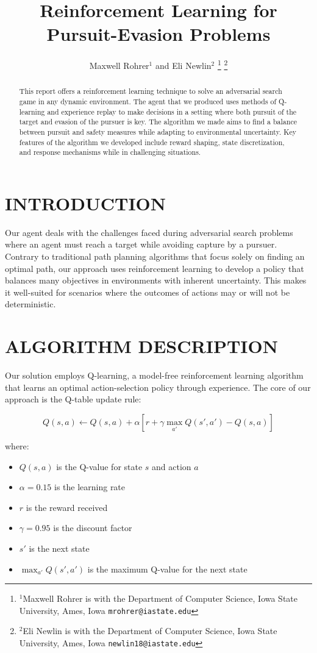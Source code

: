 \documentclass[letterpaper, 10 pt, conference]{ieeeconf}
\title{\LARGE \bf
Reinforcement Learning for Pursuit-Evasion Problems
}
\author{Maxwell Rohrer$^{1}$ and Eli Newlin$^{2}$%
\thanks{$^{1}$Maxwell Rohrer is with the Department of Computer Science, Iowa State University, Ames, Iowa
        {\tt\small mrohrer@iastate.edu}}%
\thanks{$^{2}$Eli Newlin is with the Department of Computer Science, Iowa State University, Ames, Iowa
        {\tt\small newlin18@iastate.edu}}%
}
\begin{document}
\maketitle
\thispagestyle{empty}
\pagestyle{empty}

\begin{abstract}
This report offers a reinforcement learning technique to solve an adversarial search game in any dynamic environment. The agent that we produced uses methods of Q-learning and experience replay to make decisions in a setting where both pursuit of the target and evasion of the pursuer is key. The algorithm we made aims to find a balance between pursuit and safety measures while adapting to environmental uncertainty. Key features of the algorithm we developed include reward shaping, state discretization, and response mechanisms while in challenging situations.
\end{abstract}

\section{INTRODUCTION}
Our agent deals with the challenges faced during adversarial search problems where an agent must reach a target while avoiding capture by a pursuer. Contrary to traditional path planning algorithms that focus solely on finding an optimal path, our approach uses reinforcement learning to develop a policy that balances many objectives in environments with inherent uncertainty. This makes it well-suited for scenarios where the outcomes of actions may or will not be deterministic.

\section{ALGORITHM DESCRIPTION}
Our solution employs Q-learning, a model-free reinforcement learning algorithm that learns an optimal action-selection policy through experience. The core of our approach is the Q-table update rule:

\[
Q(s,a) \leftarrow Q(s,a) + \alpha [r + \gamma \max_{a'} Q(s',a') - Q(s,a)]
\]

where:
\begin{itemize}
    \item $Q(s,a)$ is the Q-value for state $s$ and action $a$
    \item $\alpha = 0.15$ is the learning rate
    \item $r$ is the reward received
    \item $\gamma = 0.95$ is the discount factor
    \item $s'$ is the next state
    \item $\max_{a'} Q(s',a')$ is the maximum Q-value for the next state
\end{itemize}
\end{document}
